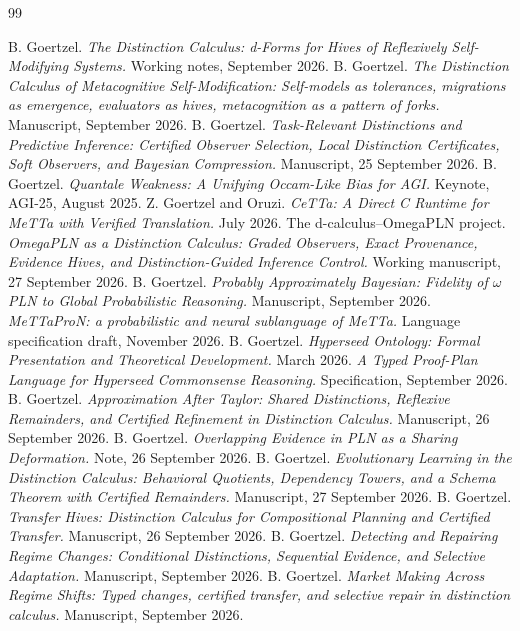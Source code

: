 \documentclass[11pt]{article}
\theoremstyle{definition}
\theoremstyle{plain}
\begin{document}
\begin{thebibliography}{99}\small

 B. Goertzel. \emph{The Distinction Calculus: d-Forms for Hives of Reflexively Self-Modifying Systems.} Working notes, September 2026.
 B. Goertzel. \emph{The Distinction Calculus of Metacognitive Self-Modification: Self-models as tolerances, migrations as emergence, evaluators as hives, metacognition as a pattern of forks.} Manuscript, September 2026.
 B. Goertzel. \emph{Task-Relevant Distinctions and Predictive Inference: Certified Observer Selection, Local Distinction Certificates, Soft Observers, and Bayesian Compression.} Manuscript, 25 September 2026.
 B. Goertzel. \emph{Quantale Weakness: A Unifying Occam-Like Bias for AGI.} Keynote, AGI-25, August 2025.
 Z. Goertzel and Oruzi. \emph{CeTTa: A Direct C Runtime for MeTTa with Verified Translation.} July 2026.
 The d-calculus--OmegaPLN project. \emph{OmegaPLN as a Distinction Calculus: Graded Observers, Exact Provenance, Evidence Hives, and Distinction-Guided Inference Control.} Working manuscript, 27 September 2026.
 B. Goertzel. \emph{Probably Approximately Bayesian: Fidelity of $\omega$PLN to Global Probabilistic Reasoning.} Manuscript, September 2026.
 \emph{MeTTaProN: a probabilistic and neural sublanguage of MeTTa.} Language specification draft, November 2026.
 B. Goertzel. \emph{Hyperseed Ontology: Formal Presentation and Theoretical Development.} March 2026.
 \emph{A Typed Proof-Plan Language for Hyperseed Commonsense Reasoning.} Specification, September 2026.
 B. Goertzel. \emph{Approximation After Taylor: Shared Distinctions, Reflexive Remainders, and Certified Refinement in Distinction Calculus.} Manuscript, 26 September 2026.
 B. Goertzel. \emph{Overlapping Evidence in PLN as a Sharing Deformation.} Note, 26 September 2026.
 B. Goertzel. \emph{Evolutionary Learning in the Distinction Calculus: Behavioral Quotients, Dependency Towers, and a Schema Theorem with Certified Remainders.} Manuscript, 27 September 2026.
 B. Goertzel. \emph{Transfer Hives: Distinction Calculus for Compositional Planning and Certified Transfer.} Manuscript, 26 September 2026.
 B. Goertzel. \emph{Detecting and Repairing Regime Changes: Conditional Distinctions, Sequential Evidence, and Selective Adaptation.} Manuscript, September 2026.
 B. Goertzel. \emph{Market Making Across Regime Shifts: Typed changes, certified transfer, and selective repair in distinction calculus.} Manuscript, September 2026.

\end{thebibliography}
\end{document}
